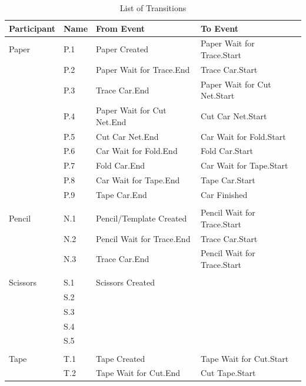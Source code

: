 \documentclass[
  10pt,
  a4paperpaper,
  DIV=11,
  numbers=noendperiod,
  oneside]{scrreprt}
\begin{document}
\begin{longtable}{p{2.4cm}>{\raggedright\arraybackslash}p{1.2cm}>{\raggedright\arraybackslash}p{5.9cm}>{\raggedright\arraybackslash}p{5.9cm}}

\caption{\label{tbl-transitions_pc}List of Transitions}

\tabularnewline

\toprule
Participant & Name & From Event & To Event       \\ \midrule
\endhead
Paper & P.1 & Paper Created & Paper Wait for Trace.Start \\
      & P.2 & Paper Wait for Trace.End & Trace Car.Start \\
      & P.3 & Trace Car.End & Paper Wait for Cut Net.Start \\
      & P.4 & Paper Wait for Cut Net.End & Cut Car Net.Start \\
      & P.5 & Cut Car Net.End & Car Wait for Fold.Start \\
      & P.6 & Car Wait for Fold.End & Fold Car.Start \\
      & P.7 & Fold Car.End & Car Wait for Tape.Start \\
      & P.8 & Car Wait for Tape.End & Tape Car.Start \\
      & P.9 & Tape Car.End & Car Finished \\
      &      &              &              \\
Pencil & N.1 & Pencil/Template Created & Pencil Wait for Trace.Start \\
       & N.2 & Pencil Wait for Trace.End & Trace Car.Start \\
       & N.3 & Trace Car.End & Pencil Wait for Trace.Start \\
       &      &              &              \\
Scissors & S.1 & Scissors Created             &              \\
       & S.2   &              &              \\
       & S.3   &              &              \\
       & S.4   &              &              \\
       & S.5   &              &              \\
       &      &              &              \\
Tape   & T.1 & Tape Created & Tape Wait for Cut.Start \\
       & T.2 & Tape Wait for Cut.End & Cut Tape.Start \\

\end{longtable}
\end{document}
